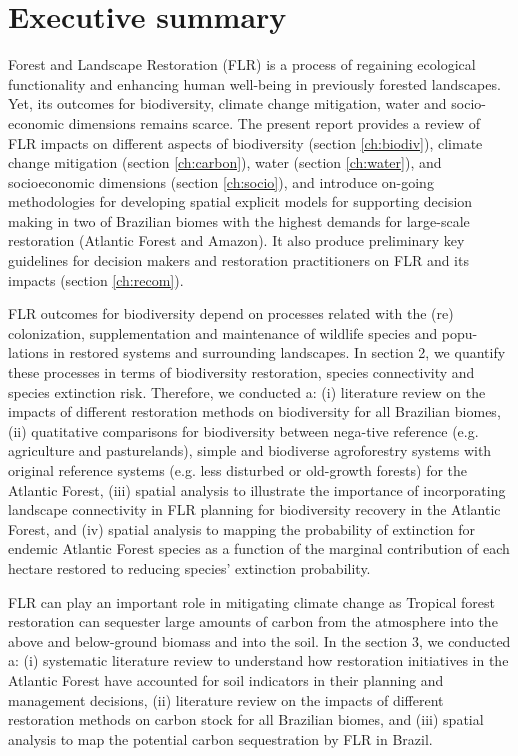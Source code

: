 
\chapter*{Executive summary}\label{ch:summary}

Forest  and  Landscape  Restoration  (FLR) is  a  process of regaining ecological functionality and enhancing human well-being in previously forested landscapes. Yet, its outcomes for biodiversity, climate change mitigation, water and socio-economic dimensions remains scarce. The present report provides a review of FLR impacts on different aspects of biodiversity (section \ref{ch:biodiv}), climate change mitigation (section \ref{ch:carbon}), water (section \ref{ch:water}), and socioeconomic dimensions (section \ref{ch:socio}), and introduce on-going methodologies for developing spatial explicit models for supporting decision making in two of Brazilian biomes with the highest demands for large-scale restoration (Atlantic Forest and Amazon). It also produce preliminary key guidelines for decision makers and restoration practitioners on FLR and its impacts (section \ref{ch:recom}).

FLR outcomes for biodiversity depend on processes related with the (re) colonization, supplementation and maintenance of wildlife species and popu-lations in restored systems and surrounding landscapes. In section 2, we quantify these processes in terms of biodiversity restoration, species connectivity and species extinction risk. Therefore, we conducted a: (i) literature review on the impacts of different restoration methods on biodiversity for all Brazilian biomes, (ii) quatitative comparisons for biodiversity between nega-tive reference (e.g. agriculture and pasturelands), simple and biodiverse agroforestry systems with original reference systems (e.g. less disturbed or old-growth forests) for the Atlantic Forest, (iii) spatial analysis to illustrate the importance of incorporating landscape connectivity in FLR planning for biodiversity recovery in the Atlantic Forest, and (iv) spatial analysis to mapping the probability of extinction for endemic Atlantic Forest species as a function of the marginal contribution of each hectare restored to reducing species’ extinction probability.

FLR can play an important role in mitigating climate change as Tropical forest restoration can sequester large amounts of carbon from the atmosphere into the above and below-ground biomass and into the soil. In the section 3, we conducted a: (i) systematic literature review to understand how restoration initiatives in the Atlantic Forest have accounted for soil indicators in their planning and management decisions, (ii) literature review  on the impacts of different restoration methods on carbon stock for all Brazilian biomes, and (iii) spatial analysis to map the potential carbon sequestration by FLR in Brazil.

